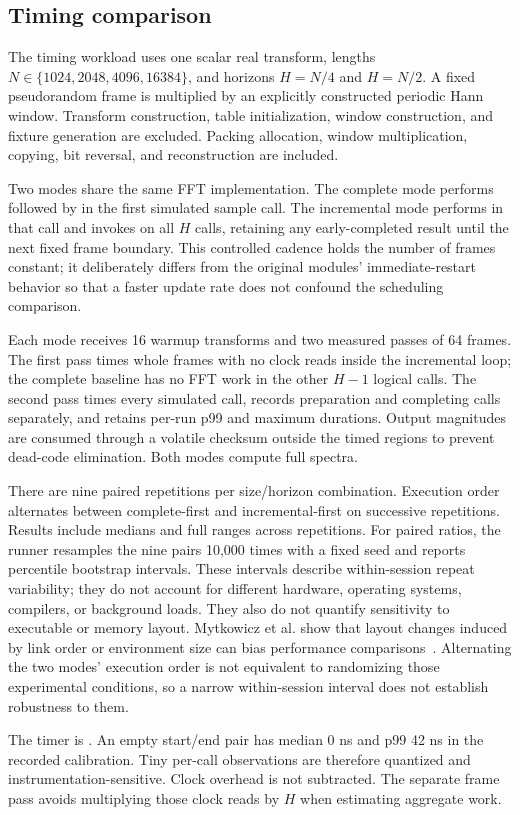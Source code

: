 \subsection{Timing comparison}
The timing workload uses one scalar  real transform, lengths
$N\in\{1024,2048,4096,16384\}$, and horizons $H=N/4$ and $H=N/2$. A fixed
pseudorandom frame is multiplied by an explicitly constructed periodic Hann
window. Transform construction, table initialization, window construction, and
fixture generation are excluded. Packing allocation, window multiplication,
copying, bit reversal, and reconstruction are included.

Two modes share the same FFT implementation. The complete mode performs
 followed by  in the first simulated sample
call. The incremental mode performs  in that call and invokes
 on all $H$ calls, retaining any early-completed result until the
next fixed frame boundary. This controlled cadence holds the number of frames
constant; it deliberately differs from the original modules' immediate-restart behavior
so that a faster update rate does not confound the scheduling comparison.

Each mode receives 16 warmup transforms and two measured passes of 64 frames.
The first pass times whole frames with no clock reads inside the incremental
loop; the complete baseline has no FFT work in the other $H-1$ logical calls.
The second pass times every simulated call, records preparation and completing
calls separately, and retains per-run p99 and maximum durations. Output
magnitudes are consumed through a volatile checksum outside the timed regions
to prevent dead-code elimination. Both modes compute full spectra.

There are nine paired repetitions per size/horizon combination. Execution order
alternates between complete-first and incremental-first on successive
repetitions. Results include medians and full ranges across repetitions. For
paired ratios, the runner resamples the nine pairs 10,000 times with a fixed
seed and reports percentile bootstrap intervals. These intervals describe
within-session repeat variability; they do not account for different hardware,
operating systems, compilers, or background loads.
They also do not quantify sensitivity to executable or memory layout.
Mytkowicz et al. show that layout changes induced by link order or environment
size can bias performance comparisons~\cite{mytkowicz2009}. Alternating the
two modes' execution order is not equivalent to randomizing those experimental
conditions, so a narrow within-session interval does not establish robustness
to them.

The timer is . An empty start/end pair has median
0 ns and p99 42 ns in the recorded calibration. Tiny per-call observations are
therefore quantized and instrumentation-sensitive. Clock overhead is not
subtracted. The separate frame pass avoids multiplying those clock reads by
$H$ when estimating aggregate work.

